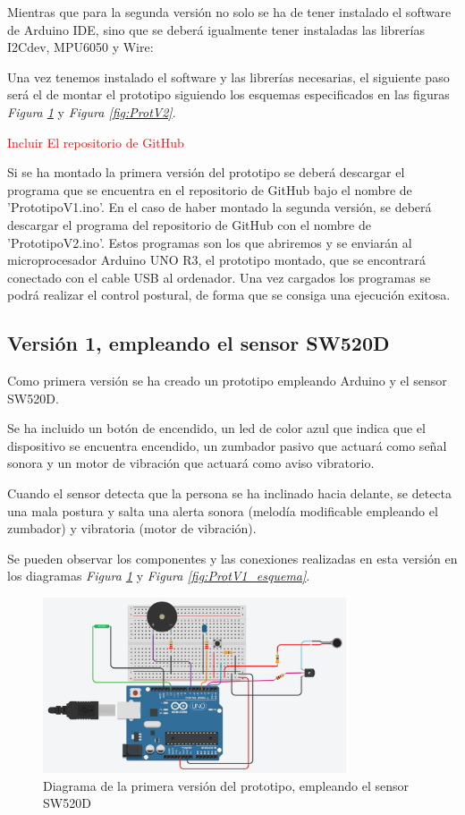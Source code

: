 Mientras que para la segunda versión no solo se ha de tener instalado el software de Arduino IDE, sino que se deberá igualmente tener instaladas las librerías I2Cdev\cite{LibI2Cdev}, MPU6050\cite{LibMPU6050} y Wire\cite{LibWire}: 

Una vez tenemos instalado el software y las librerías necesarias, el siguiente paso será el de montar el prototipo siguiendo los esquemas especificados en las figuras \textit{Figura \ref{fig:ProtV1}} y \textit{Figura \ref{fig:ProtV2}}.

\textcolor{red}{Incluir El repositorio de GitHub}

Si se ha montado la primera versión del prototipo se deberá descargar el programa que se encuentra en el repositorio de GitHub\cite{GitHub} bajo el nombre de 'PrototipoV1.ino'. En el caso de haber montado la segunda versión, se deberá descargar el programa del repositorio de GitHub\cite{GitHub} con el nombre de 'PrototipoV2.ino'. Estos programas son los que abriremos y se enviarán al microprocesador Arduino UNO R3\cite{Arduino2}, el prototipo montado, que se encontrará conectado con el cable USB al ordenador. Una vez cargados los programas se podrá realizar el control postural, de forma que se consiga una ejecución exitosa.


\subsection{Versión 1, empleando el sensor SW520D}
Como primera versión se ha creado un prototipo empleando Arduino\cite{Arduino1} y el sensor SW520D\cite{SW520D_1}.

Se ha incluido un botón de encendido, un led de color azul que indica que el dispositivo se encuentra encendido, un zumbador pasivo que actuará como señal sonora y un motor de vibración que actuará como aviso vibratorio.

Cuando el sensor detecta que la persona se ha inclinado hacia delante, se detecta una mala postura y salta una alerta sonora (melodía modificable empleando el zumbador) y vibratoria (motor de vibración).

Se pueden observar los componentes y las conexiones realizadas en esta versión en los diagramas \textit{Figura \ref{fig:ProtV1}} y \textit{Figura \ref{fig:ProtV1_esquema}}. 

\begin{figure}[h!]
    \centering
    \includegraphics[width=0.8\textwidth]{img/PrototipoV1_Tilt.png}
    \caption{Diagrama de la primera versión del prototipo, empleando el sensor SW520D}
    \label{fig:ProtV1}
\end{figure}

